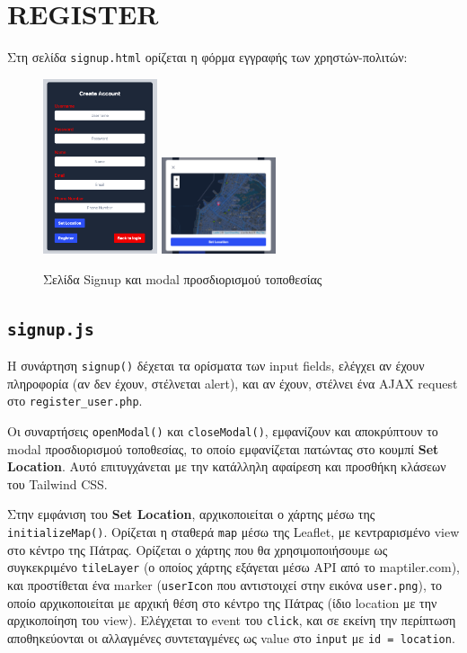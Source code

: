 \section{REGISTER}
    Στη σελίδα \texttt{signup.html} ορίζεται η φόρμα εγγραφής των χρηστών-πολιτών:

    \begin{figure}[H] \noindent \centering
        \includegraphics[width=0.3\textwidth]{img/register}
        \includegraphics[width=0.3\textwidth]{img/register-location}
        \caption{Σελίδα Signup και modal προσδιορισμού τοποθεσίας}
    \end{figure}

    \subsection{\texttt{signup.js}}
        Η συνάρτηση \texttt{signup()} δέχεται τα ορίσματα των input fields, ελέγχει αν έχουν πληροφορία (αν δεν έχουν, στέλνεται alert),
            και αν έχουν, στέλνει ένα AJAX request στο \texttt{register\_user.php}.

        Οι συναρτήσεις \texttt{openModal()} και \texttt{closeModal()}, εμφανίζουν και αποκρύπτουν το modal προσδιορισμού τοποθεσίας,
            το οποίο εμφανίζεται πατώντας στο κουμπί \textbf{Set Location}.
        Αυτό επιτυγχάνεται με την κατάλληλη αφαίρεση και προσθήκη κλάσεων του Tailwind CSS.

        Στην εμφάνιση του \textbf{Set Location}, αρχικοποιείται ο χάρτης μέσω της \texttt{initializeMap()}.
        Ορίζεται η σταθερά \texttt{map} μέσω της Leaflet, με κεντραρισμένο view στο κέντρο της Πάτρας.
        Ορίζεται ο χάρτης που θα χρησιμοποιήσουμε ως συγκεκριμένο \texttt{tileLayer} (ο οποίος χάρτης εξάγεται μέσω API από το maptiler.com),
            και προστίθεται ένα marker (\texttt{userIcon} που αντιστοιχεί στην εικόνα \texttt{user.png}), το οποίο αρχικοποιείται με αρχική θέση στο κέντρο της Πάτρας (ίδιο location με την αρχικοποίηση του view).
        Ελέγχεται το event του \texttt{click}, και σε εκείνη την περίπτωση αποθηκεύονται οι αλλαγμένες συντεταγμένες ως value στο \texttt{input} με \mbox{\texttt{id = location}}.

